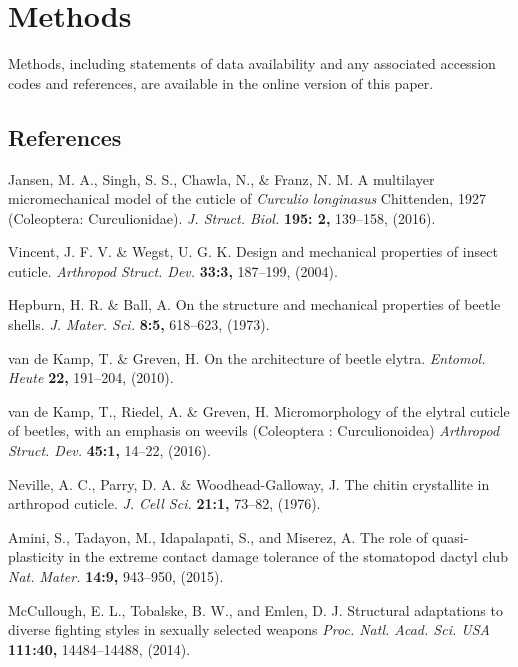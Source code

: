 \documentclass[twocolumn, linenumbers, superscriptaddress, nofootinbib]{revtex4-1}
\begin{document}
	\section{Methods}
		Methods, including statements of data availability and any associated accession codes and references, are available in the online version of this paper.
	
	\begin{thebibliography}{50}
		\section*{References}
				Jansen, M. A., Singh, S. S., Chawla, N., \& Franz, N. M.
				A multilayer micromechanical model of the cuticle of \textit{Curculio longinasus} Chittenden, 1927 (Coleoptera: Curculionidae).
				\textit{J. Struct. Biol.}
				\textbf{195: 2,}
				139--158,
				(2016).
					
				Vincent, J. F. V. \& Wegst, U. G. K.
				Design and mechanical properties of insect cuticle.				
				\textit{Arthropod Struct. Dev.}
				\textbf{33:3,}
				187--199,
				(2004).
				
				Hepburn, H. R. \& Ball, A.
				On the structure and mechanical properties of beetle shells.
				\textit{J. Mater. Sci.}
				\textbf{8:5,}
				618--623,
				(1973).
			
				van de Kamp, T. \& Greven, H.
				On the architecture of beetle elytra.
				\textit{Entomol. Heute}
				\textbf{22,}
				191--204,
				(2010).
			
				van de Kamp, T., Riedel, A. \& Greven, H.
				Micromorphology of the elytral cuticle of beetles, with an emphasis on weevils (Coleoptera : Curculionoidea)
				\textit{Arthropod Struct. Dev.}
				\textbf{45:1,}
				14--22,
				(2016).
			
				Neville, A. C., Parry, D. A. \& Woodhead-Galloway, J.
				The chitin crystallite in arthropod cuticle.
				\textit{J. Cell Sci.}
				\textbf{21:1,}
				73--82,
				(1976).
			
				Amini, S., Tadayon, M., Idapalapati, S., and Miserez, A.
				The role of quasi-plasticity in the extreme contact damage tolerance of the stomatopod dactyl club
				\textit{Nat. Mater.}
				\textbf{14:9,}
				943--950,
				(2015).
				
				McCullough, E. L., Tobalske, B. W., and Emlen, D. J.
				Structural adaptations to diverse fighting styles in sexually selected weapons
				\textit{Proc. Natl. Acad. Sci. USA}
				\textbf{111:40,}
				14484--14488,
				(2014).
				

\end{thebibliography}
\end{document}
